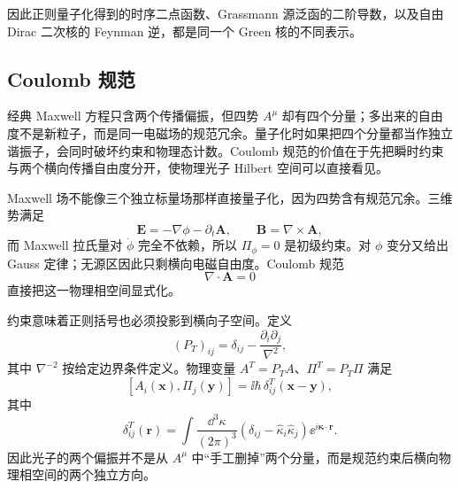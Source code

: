 因此正则量子化得到的时序二点函数、Grassmann 源泛函的二阶导数，以及自由 Dirac 二次核的 Feynman 逆，都是同一个 Green 核的不同表示。

\subsection{Coulomb 规范}

经典 Maxwell 方程只含两个传播偏振，但四势 \(A^\mu\) 却有四个分量；多出来的自由度不是新粒子，而是同一电磁场的规范冗余。量子化时如果把四个分量都当作独立谐振子，会同时破坏约束和物理态计数。Coulomb 规范的价值在于先把瞬时约束与两个横向传播自由度分开，使物理光子 Hilbert 空间可以直接看见。

Maxwell 场不能像三个独立标量场那样直接量子化，因为四势含有规范冗余。三维势满足
\begin{equation*}
\mathbf E=-\nabla\phi-\partial_t\mathbf A,
\qquad
\mathbf B=\nabla\times\mathbf A,
\end{equation*}
而 Maxwell 拉氏量对 $\dot\phi$ 完全不依赖，所以 $\Pi_\phi=0$ 是初级约束。对 $\phi$ 变分又给出 Gauss 定律；无源区因此只剩横向电磁自由度。Coulomb 规范
\begin{equation*}
\nabla\cdot\mathbf A=0
\end{equation*}
直接把这一物理相空间显式化。

约束意味着正则括号也必须投影到横向子空间。定义
\begin{equation*}
(P_T)_{ij}=\delta_{ij}-\frac{\partial_i\partial_j}{\nabla^2},
\end{equation*}
其中 $\nabla^{-2}$ 按给定边界条件定义。物理变量 $A^T=P_TA$、$\Pi^T=P_T\Pi$ 满足
\begin{equation}
\boxed{
[A_i(\mathbf x),\Pi_j(\mathbf y)]
=\ii\hbar\,\delta^T_{ij}(\mathbf x-\mathbf y),}
\label{eq:transverse-comm-r2}
\end{equation}
其中
\begin{equation*}
\delta^T_{ij}(\mathbf r)
=\int\frac{\dd^3 \kappa}{(2\pi)^3}
\left(\delta_{ij}-\hat\kappa_i\hat\kappa_j\right)\ee^{i\boldsymbol\kappa\cdot\mathbf r}.
\end{equation*}
因此光子的两个偏振并不是从 $A^\mu$ 中“手工删掉”两个分量，而是规范约束后横向物理相空间的两个独立方向。

